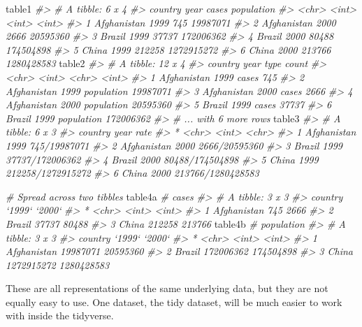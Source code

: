 \documentclass[]{book}
\newenvironment{Shaded}{\begin{snugshade}}{\end{snugshade}}
\newcommand{\CommentTok}[1]{\textcolor[rgb]{0.56,0.35,0.01}{\textit{#1}}}
\newcommand{\NormalTok}[1]{#1}
\begin{document}
\begin{Shaded}
\begin{Highlighting}[]
\NormalTok{table1}
\CommentTok{#> # A tibble: 6 x 4}
\CommentTok{#>   country      year  cases population}
\CommentTok{#>   <chr>       <int>  <int>      <int>}
\CommentTok{#> 1 Afghanistan  1999    745   19987071}
\CommentTok{#> 2 Afghanistan  2000   2666   20595360}
\CommentTok{#> 3 Brazil       1999  37737  172006362}
\CommentTok{#> 4 Brazil       2000  80488  174504898}
\CommentTok{#> 5 China        1999 212258 1272915272}
\CommentTok{#> 6 China        2000 213766 1280428583}
\NormalTok{table2}
\CommentTok{#> # A tibble: 12 x 4}
\CommentTok{#>   country      year type           count}
\CommentTok{#>   <chr>       <int> <chr>          <int>}
\CommentTok{#> 1 Afghanistan  1999 cases            745}
\CommentTok{#> 2 Afghanistan  1999 population  19987071}
\CommentTok{#> 3 Afghanistan  2000 cases           2666}
\CommentTok{#> 4 Afghanistan  2000 population  20595360}
\CommentTok{#> 5 Brazil       1999 cases          37737}
\CommentTok{#> 6 Brazil       1999 population 172006362}
\CommentTok{#> # ... with 6 more rows}
\NormalTok{table3}
\CommentTok{#> # A tibble: 6 x 3}
\CommentTok{#>   country      year rate             }
\CommentTok{#> * <chr>       <int> <chr>            }
\CommentTok{#> 1 Afghanistan  1999 745/19987071     }
\CommentTok{#> 2 Afghanistan  2000 2666/20595360    }
\CommentTok{#> 3 Brazil       1999 37737/172006362  }
\CommentTok{#> 4 Brazil       2000 80488/174504898  }
\CommentTok{#> 5 China        1999 212258/1272915272}
\CommentTok{#> 6 China        2000 213766/1280428583}

\CommentTok{# Spread across two tibbles}
\NormalTok{table4a  }\CommentTok{# cases}
\CommentTok{#> # A tibble: 3 x 3}
\CommentTok{#>   country     `1999` `2000`}
\CommentTok{#> * <chr>        <int>  <int>}
\CommentTok{#> 1 Afghanistan    745   2666}
\CommentTok{#> 2 Brazil       37737  80488}
\CommentTok{#> 3 China       212258 213766}
\NormalTok{table4b  }\CommentTok{# population}
\CommentTok{#> # A tibble: 3 x 3}
\CommentTok{#>   country         `1999`     `2000`}
\CommentTok{#> * <chr>            <int>      <int>}
\CommentTok{#> 1 Afghanistan   19987071   20595360}
\CommentTok{#> 2 Brazil       172006362  174504898}
\CommentTok{#> 3 China       1272915272 1280428583}
\end{Highlighting}
\end{Shaded}

These are all representations of the same underlying data, but they are
not equally easy to use. One dataset, the tidy dataset, will be much
easier to work with inside the tidyverse.
\end{document}
